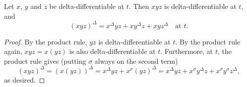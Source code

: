 \documentclass[nonumber]{homework}
\begin{document}
	Let $x$, $y$ and $z$ be delta-differentiable at $t$. Then $xyz$ is delta-differentiable at $t$, and
	\begin{equation*}
		(xyz)^\Delta = x^\Delta yz + xy^\Delta z + xyz^\Delta \quad \text{at }t.
	\end{equation*}
	
	\begin{proof}
		By the product rule, $yz$ is delta-differentiable at $t$. By the product rule again, $xyz = x(yz)$ is also delta-differentiable at $t$. Furthermore, at $t$, the product rule gives (putting $\sigma$ always on the second term)
		\begin{equation*}
			(xyz)^\Delta = (x(yz))^\Delta = x^\Delta yz + x^\sigma (yz)^\Delta = x^\Delta yz + x^\sigma y^\Delta z + x^\sigma y^\sigma z^\Delta,
		\end{equation*}
		as desired.
	\end{proof}
	
	
\end{document}
